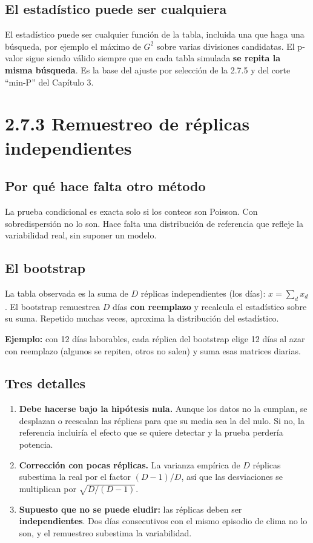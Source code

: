 \documentclass[11pt,a4paper]{article}
\begin{document}
\subsection{El estadístico puede ser cualquiera}

El estadístico puede ser cualquier función de la tabla, incluida una que haga una
búsqueda, por ejemplo el máximo de $G^2$ sobre varias divisiones candidatas. El
p-valor sigue siendo válido siempre que en cada tabla simulada \textbf{se repita la
misma búsqueda}. Es la base del ajuste por selección de la 2.7.5 y del corte
``min-P'' del Capítulo 3.

\section{2.7.3 Remuestreo de réplicas independientes}

\subsection{Por qué hace falta otro método}

La prueba condicional es exacta solo si los conteos son Poisson. Con sobredispersión
no lo son. Hace falta una distribución de referencia que refleje la variabilidad
real, sin suponer un modelo.

\subsection{El bootstrap}

La tabla observada es la suma de $D$ réplicas independientes (los días):
$x=\sum_d x_d$. El bootstrap remuestrea $D$ días \textbf{con reemplazo} y recalcula
el estadístico sobre su suma. Repetido muchas veces, aproxima la distribución del
estadístico.

\textbf{Ejemplo:} con 12 días laborables, cada réplica del bootstrap elige 12 días
al azar con reemplazo (algunos se repiten, otros no salen) y suma esas matrices
diarias.

\subsection{Tres detalles}

\begin{enumerate}
  \item \textbf{Debe hacerse bajo la hipótesis nula.} Aunque los datos no la
  cumplan, se desplazan o reescalan las réplicas para que su media sea la del nulo.
  Si no, la referencia incluiría el efecto que se quiere detectar y la prueba
  perdería potencia.
  \item \textbf{Corrección con pocas réplicas.} La varianza empírica de $D$ réplicas
  subestima la real por el factor $(D-1)/D$, así que las desviaciones se multiplican
  por $\sqrt{D/(D-1)}$.
  \item \textbf{Supuesto que no se puede eludir:} las réplicas deben ser
  \textbf{independientes}. Dos días consecutivos con el mismo episodio de clima no
  lo son, y el remuestreo subestima la variabilidad.
\end{enumerate}
\end{document}
